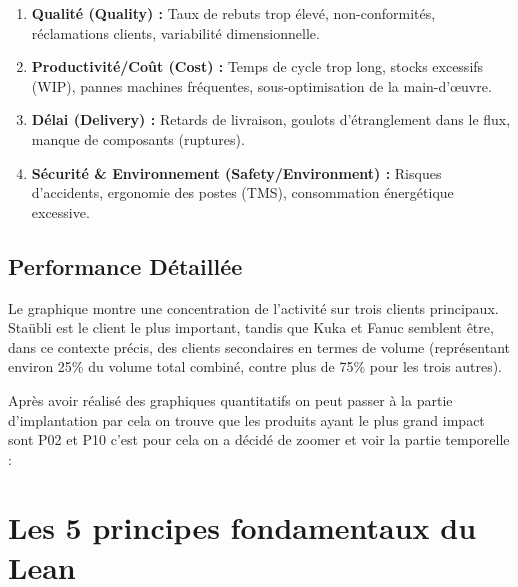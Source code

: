 \documentclass[11pt,a4paper]{article}
\begin{document}
\begin{enumerate}[leftmargin=*,itemsep=0.5em]
  \item \textbf{Qualité (Quality) :} Taux de rebuts trop élevé, non-conformités, réclamations clients, variabilité dimensionnelle.
  
  \item \textbf{Productivité/Coût (Cost) :} Temps de cycle trop long, stocks excessifs (WIP), pannes machines fréquentes, sous-optimisation de la main-d'œuvre.
  
  \item \textbf{Délai (Delivery) :} Retards de livraison, goulots d'étranglement dans le flux, manque de composants (ruptures).
  
  \item \textbf{Sécurité \& Environnement (Safety/Environment) :} Risques d'accidents, ergonomie des postes (TMS), consommation énergétique excessive.
\end{enumerate}

\vspace{1cm}
\begin{center}
\end{center}
\vspace{1cm}

\subsection{Performance Détaillée}

Le graphique montre une concentration de l'activité sur trois clients principaux. Staübli est le client le plus important, tandis que Kuka et Fanuc semblent être, dans ce contexte précis, des clients secondaires en termes de volume (représentant environ 25\% du volume total combiné, contre plus de 75\% pour les trois autres).

\vspace{0.5cm}

Après avoir réalisé des graphiques quantitatifs on peut passer à la partie d'implantation par cela on trouve que les produits ayant le plus grand impact sont P02 et P10 c'est pour cela on a décidé de zoomer et voir la partie temporelle :

\newpage
\section{Les 5 principes fondamentaux du Lean}
\end{document}
